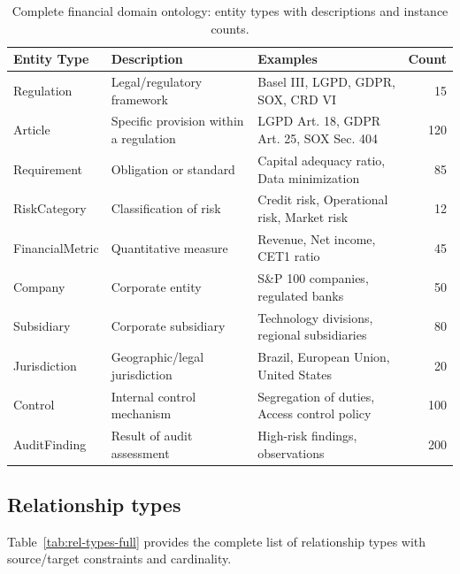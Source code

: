 \documentclass[review]{elsarticle}
\begin{document}
\begin{table}[ht]
\caption{Complete financial domain ontology: entity types with descriptions and instance counts.}
\label{tab:entity-types-full}
\centering
\small
\begin{tabular}{@{}llp{4cm}r@{}}
\toprule
\textbf{Entity Type} & \textbf{Description} & \textbf{Examples} & \textbf{Count} \\
\midrule
Regulation & Legal/regulatory framework & Basel III, LGPD, GDPR, SOX, CRD VI & 15 \\
Article & Specific provision within a regulation & LGPD Art. 18, GDPR Art. 25, SOX Sec. 404 & 120 \\
Requirement & Obligation or standard & Capital adequacy ratio, Data minimization & 85 \\
RiskCategory & Classification of risk & Credit risk, Operational risk, Market risk & 12 \\
FinancialMetric & Quantitative measure & Revenue, Net income, CET1 ratio & 45 \\
Company & Corporate entity & S\&P 100 companies, regulated banks & 50 \\
Subsidiary & Corporate subsidiary & Technology divisions, regional subsidiaries & 80 \\
Jurisdiction & Geographic/legal jurisdiction & Brazil, European Union, United States & 20 \\
Control & Internal control mechanism & Segregation of duties, Access control policy & 100 \\
AuditFinding & Result of audit assessment & High-risk findings, observations & 200 \\
\bottomrule
\end{tabular}
\end{table}

\subsection{Relationship types}

Table~\ref{tab:rel-types-full} provides the complete list of relationship types with source/target constraints and cardinality.
\end{document}

